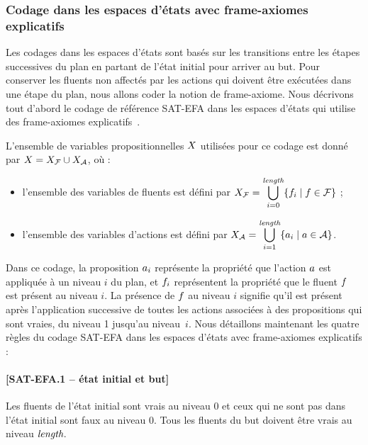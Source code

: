 %
%

\subsubsection{Codage dans les espaces d'états avec frame-axiomes explicatifs}


Les codages dans les espaces d'états sont basés sur les transitions entre les étapes successives du plan en partant de l'état initial pour arriver au but.
Pour conserver les fluents non affectés par les actions qui doivent être exécutées dans une étape du plan, nous allons coder la notion de frame-axiome.
Nous décrivons tout d'abord le codage de référence SAT-EFA dans les espaces d'états qui utilise des frame-axiomes explicatifs~\cite{MK99}.


L'ensemble de variables propositionnelles $X$ utilisées pour ce codage est donné par $X = X_{\mathcal{F}} \cup X_{\mathcal{A}}$, où :
\begin{itemize}
    \item l'ensemble des variables de fluents est défini par $\displaystyle X_{\mathcal{F}}=\bigcup_{i=0}^{\textit{length}}\{f_{i}\mid f\in\mathcal{F}\}$ ;
    \item l'ensemble des variables d'actions est défini par $\displaystyle X_{\mathcal{A}}=\bigcup_{i=1}^{\textit{length}}\{a_{i}\mid a\in\mathcal{A}\}$.
\end{itemize}

Dans ce codage, la proposition $a_{i}$ représente la propriété que l'action $a$ est appliquée à un niveau $i$ du plan, et $f_{i}$ représentent la propriété que le fluent $f$ est présent au niveau
$i$. La présence de $f$ au niveau $i$ signifie qu'il est présent après l'application successive de toutes les actions associées à des propositions qui sont vraies, du niveau 1 jusqu'au niveau~$i$. Nous détaillons maintenant les quatre règles du codage SAT-EFA dans les espaces d'états avec frame-axiomes explicatifs :





\paragraph*{[SAT-EFA.1 -- état initial et but]}
Les fluents de l'état initial sont vrais au niveau $0$ et ceux qui ne sont pas dans l'état initial sont faux au niveau $0$. Tous les fluents du but doivent être vrais au niveau $\textit{length}$.

